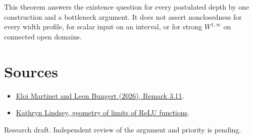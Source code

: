 \documentclass[10pt]{article}
\begin{document}
This theorem answers the existence question for every postulated depth by one construction and a bottleneck argument. It does not assert nonclosedness for every width profile, for scalar input on an interval, or for strong $W^{1,\infty}$ on connected open domains.

\section*{Sources}
\begin{itemize}
\item \href{https://arxiv.org/abs/2611.09887}{Eloi Martinet and Leon Bungert (2026), Remark 3.11}.
\item \href{https://arxiv.org/abs/2610.33779}{Kathryn Lindsey, geometry of limits of ReLU functions}.
\end{itemize}
{\small Research draft. Independent review of the argument and priority is pending.}
\end{document}
